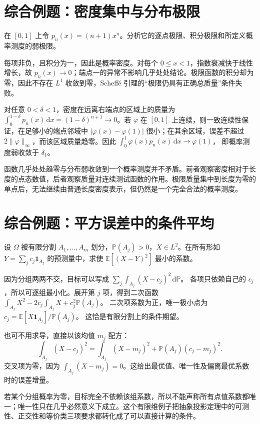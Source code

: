\section{综合例题：密度集中与分布极限}
\begin{example}
在 $[0,1]$ 上令 $p_n(x)=(n+1)x^n$。分析它的逐点极限、积分极限和所定义概率测度的弱极限。
\end{example}
\begin{solve}
每项非负，且积分为一，因此是概率密度。对每个 $0\leq x<1$，指数衰减快于线性增长，故 $p_n(x)\to0$；端点一的异常不影响几乎处处结论。极限函数的积分却为零，因此不存在 $L^1$ 收敛到零，Scheffé 引理的“极限仍具有正确总质量”条件失败。

对任意 $0<\delta<1$，密度在远离右端点的区域上的质量为
$\int_0^{1-\delta}p_n(x)\,\mathrm dx=(1-\delta)^{n+1}\to0$。若 $\varphi$ 在 $[0,1]$ 上连续，则一致连续性保证，在足够小的端点邻域中 $|\varphi(x)-\varphi(1)|$ 很小；在其余区域，误差不超过 $2\|\varphi\|_\infty$，而该区域质量趋零。因此
$\int_0^1\varphi(x)p_n(x)\,\mathrm dx\to\varphi(1)$，
即概率测度弱收敛于 $\delta_1$。
\end{solve}
函数几乎处处趋零与分布弱收敛到一个概率测度并不矛盾。前者观察密度相对于长度的点态数值，后者观察质量对连续测试函数的作用。极限质量集中到长度为零的单点后，无法继续由普通长度密度表示，但仍然是一个完全合法的概率测度。

\section{综合例题：平方误差中的条件平均}
\begin{example}
设 $\Omega$ 被有限分割 $A_1,\ldots,A_m$ 划分，$\mathbb P(A_j)>0$，$X\in L^2$。在所有形如 $Y=\sum_jc_j\mathbf1_{A_j}$ 的预测量中，求使 $\mathbb E[(X-Y)^2]$ 最小的系数。
\end{example}
\begin{solve}
因为分组两两不交，目标可以写成
$\sum_j\int_{A_j}(X-c_j)^2\,\mathrm d\mathbb P$。
各项只依赖自己的 $c_j$，所以可逐组最小化。展开第 $j$ 项，得到二次函数
$\int_{A_j}X^2-2c_j\int_{A_j}X+c_j^2\mathbb P(A_j)$。
二次项系数为正，唯一极小点为
$c_j=\mathbb E[X\mathbf1_{A_j}]/\mathbb P(A_j)$。
这恰是有限分割上的条件期望。

也可不用求导，直接以该均值 $m_j$ 配方：
\[
 \int_{A_j}(X-c_j)^2
 =\int_{A_j}(X-m_j)^2+\mathbb P(A_j)(c_j-m_j)^2.
\]
交叉项为零，因为 $\int_{A_j}(X-m_j)=0$。这给出最优值、唯一性及偏离最优系数时的误差增量。
\end{solve}
若某个分组概率为零，目标完全不依赖该组系数，所以不能声称所有点值系数都唯一；唯一性只在几乎必然意义下成立。这个有限维例子把抽象投影定理中的可测性、正交性和等价类三项要求都转化成了可以直接计算的条件。

